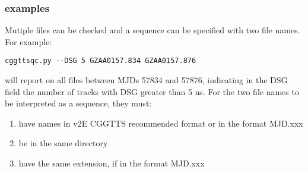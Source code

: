 \subsubsection{examples}

Mutiple files can be checked and a sequence can be specified with two file names.
For example:
\begin{lstlisting}
cggttsqc.py --DSG 5 GZAA0157.834 GZAA0157.876
\end{lstlisting}
will report on all files between MJDs 57834 and 57876, indicating in the DSG field the number of tracks with DSG greater
than 5 ns. For the two file names to be interpreted as a sequence, they must:
\begin{enumerate}
	\item have names in v2E CGGTTS recommended format or in the format MJD.xxx
	\item be in the same directory
	\item have the same extension, if in the format MJD.xxx
\end{enumerate}
